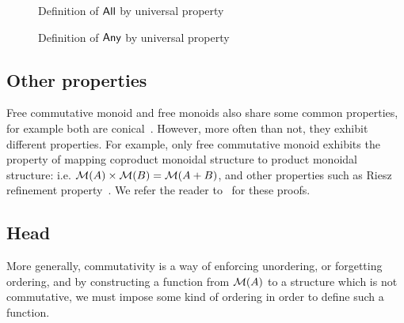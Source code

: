 \begin{figure}[H]
    \centering
    \begin{minipage}[t]{0.49\textwidth}
        \centering
        \caption{Definition of $\operatorname{\mathsf{All}}$ by universal property}
        \label{fig:enter-label}
    \end{minipage}
    \begin{minipage}[t]{0.49\textwidth}
        \centering
        \caption{Definition of $\operatorname{\mathsf{Any}}$ by universal property}
        \label{fig:enter-label}
    \end{minipage}
\end{figure}

\subsection{Other properties}
Free commutative monoid and free monoids also share some common properties,
for example both are conical~\cite{wehrungTensorProductsStructures1996}. However, more often than not,
they exhibit different properties. For example, only free commutative monoid exhibits
the property of mapping coproduct monoidal structure to product monoidal structure:
i.e. $\mathcal{M}(A) \times \mathcal{M}(B) = \mathcal{M}(A + B)$, and other properties such
as Riesz refinement property~\cite{dobbertinRefinementMonoidsVaught1983}. We
refer the reader to~\cite{choudhuryFreeCommutativeMonoids2023} for these proofs.

\subsection{Head}\label{sec:head}
More generally, commutativity is a way of enforcing unordering, or forgetting ordering,
and by constructing a function from $\mathcal{M}(A)$ to a structure which is not commutative,
we must impose some kind of ordering in order to define such a function.

